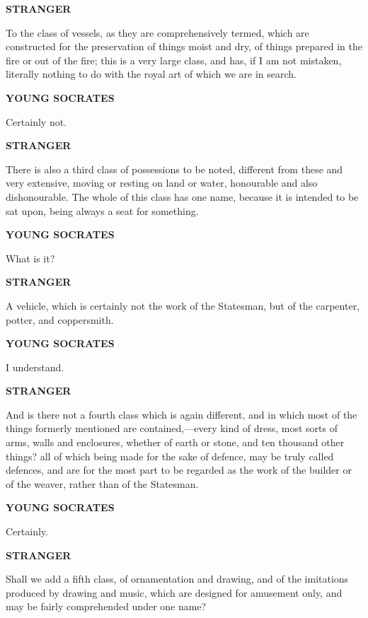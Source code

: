 \documentclass[11pt,letter]{article}
\begin{document}
\par \textbf{STRANGER}
\par   To the class of vessels, as they are comprehensively termed, which are constructed for the preservation of things moist and dry, of things prepared in the fire or out of the fire; this is a very large class, and has, if I am not mistaken, literally nothing to do with the royal art of which we are in search.

\par \textbf{YOUNG SOCRATES}
\par   Certainly not.

\par \textbf{STRANGER}
\par   There is also a third class of possessions to be noted, different from these and very extensive, moving or resting on land or water, honourable and also dishonourable. The whole of this class has one name, because it is intended to be sat upon, being always a seat for something.

\par \textbf{YOUNG SOCRATES}
\par   What is it?

\par \textbf{STRANGER}
\par   A vehicle, which is certainly not the work of the Statesman, but of the carpenter, potter, and coppersmith.

\par \textbf{YOUNG SOCRATES}
\par   I understand.

\par \textbf{STRANGER}
\par   And is there not a fourth class which is again different, and in which most of the things formerly mentioned are contained,—every kind of dress, most sorts of arms, walls and enclosures, whether of earth or stone, and ten thousand other things? all of which being made for the sake of defence, may be truly called defences, and are for the most part to be regarded as the work of the builder or of the weaver, rather than of the Statesman.

\par \textbf{YOUNG SOCRATES}
\par   Certainly.

\par \textbf{STRANGER}
\par   Shall we add a fifth class, of ornamentation and drawing, and of the imitations produced by drawing and music, which are designed for amusement only, and may be fairly comprehended under one name?
\end{document}
